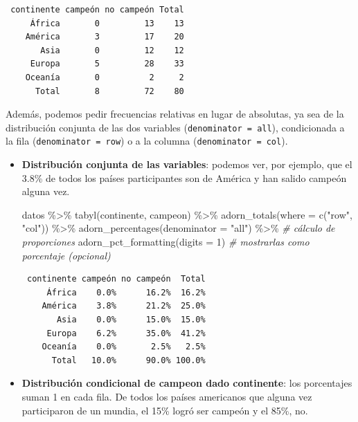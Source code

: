 \documentclass[
]{book}
\newenvironment{Shaded}{\begin{snugshade}}{\end{snugshade}}
\newcommand{\AttributeTok}[1]{\textcolor[rgb]{0.77,0.63,0.00}{#1}}
\newcommand{\CommentTok}[1]{\textcolor[rgb]{0.56,0.35,0.01}{\textit{#1}}}
\newcommand{\DecValTok}[1]{\textcolor[rgb]{0.00,0.00,0.81}{#1}}
\newcommand{\FunctionTok}[1]{\textcolor[rgb]{0.00,0.00,0.00}{#1}}
\newcommand{\NormalTok}[1]{#1}
\newcommand{\SpecialCharTok}[1]{\textcolor[rgb]{0.00,0.00,0.00}{#1}}
\newcommand{\StringTok}[1]{\textcolor[rgb]{0.31,0.60,0.02}{#1}}
\begin{document}
\begin{verbatim}
 continente campeón no campeón Total
     África       0         13    13
    América       3         17    20
       Asia       0         12    12
     Europa       5         28    33
    Oceanía       0          2     2
      Total       8         72    80
\end{verbatim}

Además, podemos pedir frecuencias relativas en lugar de absolutas, ya sea de la distribución conjunta de las dos variables (\texttt{denominator\ =\ all}), condicionada a la fila (\texttt{denominator\ =\ row}) o a la columna (\texttt{denominator\ =\ col}).

\begin{itemize}
\item
  \textbf{Distribución conjunta de las variables}: podemos ver, por ejemplo, que el 3.8\% de todos los países participantes son de América y han salido campeón alguna vez.

\begin{Shaded}
\begin{Highlighting}[]
\NormalTok{datos }\SpecialCharTok{\%\textgreater{}\%} 
  \FunctionTok{tabyl}\NormalTok{(continente, campeon) }\SpecialCharTok{\%\textgreater{}\%} 
  \FunctionTok{adorn\_totals}\NormalTok{(}\AttributeTok{where =} \FunctionTok{c}\NormalTok{(}\StringTok{"row"}\NormalTok{, }\StringTok{"col"}\NormalTok{)) }\SpecialCharTok{\%\textgreater{}\%} 
    \FunctionTok{adorn\_percentages}\NormalTok{(}\AttributeTok{denominator =} \StringTok{"all"}\NormalTok{) }\SpecialCharTok{\%\textgreater{}\%}  \CommentTok{\# cálculo de proporciones}
  \FunctionTok{adorn\_pct\_formatting}\NormalTok{(}\AttributeTok{digits =} \DecValTok{1}\NormalTok{)            }\CommentTok{\# mostrarlas como porcentaje (opcional)}
\end{Highlighting}
\end{Shaded}

\begin{verbatim}
 continente campeón no campeón  Total
     África    0.0%      16.2%  16.2%
    América    3.8%      21.2%  25.0%
       Asia    0.0%      15.0%  15.0%
     Europa    6.2%      35.0%  41.2%
    Oceanía    0.0%       2.5%   2.5%
      Total   10.0%      90.0% 100.0%
\end{verbatim}
\item
  \textbf{Distribución condicional de campeon dado continente}: los porcentajes suman 1 en cada fila. De todos los países americanos que alguna vez participaron de un mundia, el 15\% logró ser campeón y el 85\%, no.


\end{itemize}
\end{document}

